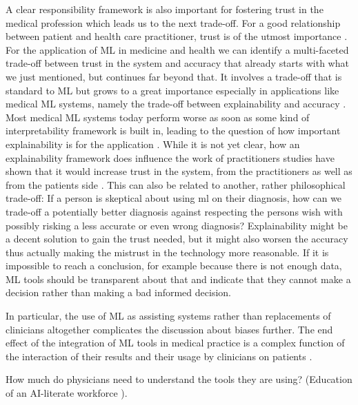 A clear responsibility framework is also important for fostering trust in the medical profession which leads us to the next trade-off. For a good relationship between patient and health care practitioner, trust is of the utmost importance \cite{clark2002trust}. For the application of ML in medicine and health we can identify a multi-faceted trade-off between trust in the system and accuracy that already starts with what we just mentioned, but continues far beyond that. It involves a trade-off that is standard to ML but grows to a great importance especially in applications like medical ML systems, namely the trade-off between explainability and accuracy \cite{topol2019high, kelly2019key}. Most medical ML systems today perform worse as soon as some kind of interpretability framework is built in, leading to the question of how important explainability is for the application \cite{luo2019balancing}. While it is not yet clear, how an explainability framework does influence the work of practitioners studies have shown that it would increase trust in the system, from the practitioners as well as from the patients side \cite{diprose2020physician, topol2019high}. This can also be related to another, rather philosophical trade-off: If a person is skeptical about using ml on their diagnosis, how can we trade-off a potentially better diagnosis against respecting the persons wish with possibly risking a less accurate or even wrong diagnosis? Explainability might be a decent solution to gain the trust needed, but it might also worsen the accuracy thus actually making the mistrust in the technology more reasonable.
If it is impossible to reach a conclusion, for example because there is not enough data, ML tools should be transparent about that and indicate that they cannot make a decision rather than making a bad informed decision.  \cite{horgan2019artificial}




In particular, the use of ML as assisting systems rather than replacements of clinicians altogether complicates the discussion about biases further.
The end effect of the integration of ML tools in medical practice is a complex function of the interaction of their results and their usage by clinicians on patients \cite[p.~4]{Rajkomar2018}.


How much do physicians need to understand the tools they are using? (Education of an AI-literate workforce \cite{he2019practical}).


